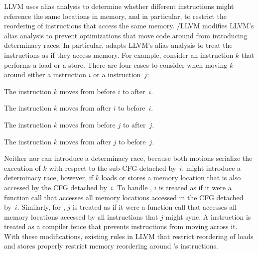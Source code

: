 
LLVM uses alias analysis \cite[Ch.~12]{AhoLaSe06} to determine whether
different instructions might reference the same locations in memory,
and in particular, to restrict the reordering of instructions that
access the same memory.  \tapir/LLVM modifies LLVM's alias analysis to
prevent optimizations that move code around from introducing
determinacy races.  In particular, \tapir adapts LLVM's alias analysis
to treat the instructions as if they access memory.  For example,
consider an instruction $k$ that performs a load or a store.  There
are four cases to consider when moving $k$ around either a \detach
instruction $i$ or a \sync instruction~$j$:
\begin{closeenum}

\item\label{case:after_detach} The instruction $k$ moves from before
  $i$ to after~$i$.

\item\label{case:before_detach} The instruction $k$ moves from after
  $i$ to before~$i$.

\item\label{case:after_sync} The instruction $k$ moves from before $j$
  to after~$j$.

\item\label{case:before_sync} The instruction $k$ moves from after $j$
  to before~$j$.

\end{closeenum}
Neither  nor  can introduce
a determinacy race, because both motions serialize the execution of
$k$ with respect to the sub-CFG detached by~$i$.
 might introduce a determinacy
race, however, if $k$ loads or stores a memory location that is also
accessed by the CFG detached by~$i$.  To handle
, $i$ is treated as if it were a function call
that accesses all memory locations accessed in the CFG detached
by~$i$.  Similarly, for , $j$ is treated as if it
were a function call that accesses all memory locations accessed by
all instructions that $j$ might sync.  A  instruction
is treated as a compiler fence that prevents instructions from moving
across it.  With these modifications, existing rules in LLVM that
restrict reordering of loads and stores properly restrict memory
reordering around \tapir's instructions.


